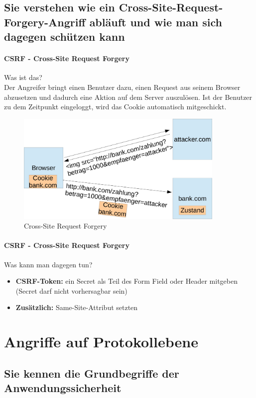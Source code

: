 \documentclass[10pt,a4paper]{article}
\begin{document}
\subsection*{Sie verstehen wie ein Cross-Site-Request-Forgery-Angriff abläuft und wie man sich dagegen schützen kann}

\paragraph*{CSRF - Cross-Site Request Forgery}Was ist das?\\
Der Angreifer bringt einen Benutzer dazu, einen Request aus seinem Browser abzusetzen und  dadurch eine Aktion auf dem Server auszulösen. Ist der Benutzer zu dem Zeitpunkt eingeloggt, wird das Cookie automatisch mitgeschickt.
\begin{figure}[H]
    \begin{center}
    \includegraphics[width=10cm]{images/CSRF.png}
    \caption{Cross-Site Request Forgery}
    \label{CSRF}
    \end{center}
\end{figure}
\paragraph*{CSRF - Cross-Site Request Forgery}Was kann man dagegen tun?
\begin{itemize}[noitemsep,topsep=0pt,leftmargin=*]
    \item \textbf{CSRF-Token:} ein Secret als Teil des Form Field oder Header mitgeben (Secret darf nicht vorhersagbar sein)
    \item \textbf{Zusätzlich:} Same-Site-Attribut setzten
\end{itemize}


\section{Angriffe auf Protokollebene}
\subsection*{Sie kennen die Grundbegriffe der Anwendungssicherheit}
\end{document}
